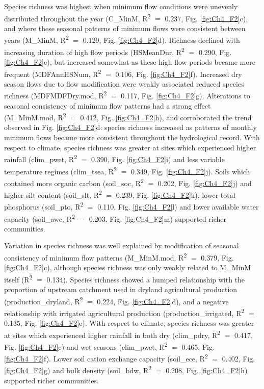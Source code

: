 Species richness was highest when minimum flow conditions were unevenly distributed throughout the year (C\_MinM, R\textsuperscript{2}  $=$ 0.237, Fig. \ref{fig:Ch4_F2}c), and where these seasonal patterns of minimum flows were consistent between years (M\_MinM, R\textsuperscript{2}  $=$ 0.129, Fig. \ref{fig:Ch4_F2}d). Richness declined with increasing duration of high flow periods (HSMeanDur, R\textsuperscript{2}  $=$ 0.290, Fig. \ref{fig:Ch4_F2}e), but increased somewhat as these high flow periods became more frequent (MDFAnnHSNum, R\textsuperscript{2}  $=$ 0.106, Fig. \ref{fig:Ch4_F2}f). Increased dry season flows due to flow modification were weakly associated reduced species richness (MDFMDFDry.mod, R\textsuperscript{2}  $=$ 0.117, Fig. \ref{fig:Ch4_F2}g). Alterations to seasonal consistency of minimum flow patterns had a strong effect (M\_MinM.mod, R\textsuperscript{2}  $=$ 0.412, Fig. \ref{fig:Ch4_F2}h), and corroborated the trend observed in Fig. \ref{fig:Ch4_F2}d: species richness increased as patterns of monthly minimum flows became more consistent throughout the hydrological record. With respect to climate, species richness was greater at sites which experienced higher rainfall (clim\_pwet, R\textsuperscript{2}  $=$ 0.390, Fig. \ref{fig:Ch4_F2}i) and less variable temperature regimes (clim\_tsea, R\textsuperscript{2}  $=$ 0.349, Fig. \ref{fig:Ch4_F2}j). Soils which contained more organic carbon (soil\_soc, R\textsuperscript{2}  $=$ 0.202, Fig. \ref{fig:Ch4_F2}j) and higher silt content (soil\_slt, R\textsuperscript{2}  $=$ 0.239, Fig. \ref{fig:Ch4_F2}k), lower total phosphorus (soil\_pto, R\textsuperscript{2}  $=$ 0.110, Fig. \ref{fig:Ch4_F2}l) and lower available water capacity (soil\_awc, R\textsuperscript{2}  $=$ 0.203, Fig. \ref{fig:Ch4_F2}m) supported richer communities.

 
Variation in species richness was well explained by modification of seasonal consistency of minimum flow patterns (M\_MinM.mod, R\textsuperscript{2}  $=$ 0.379, Fig. \ref{fig:Ch4_F2}c), although species richness was only weakly related to M_MinM itself (R\textsuperscript{2} $=$ 0.134). Species richness showed a humped relationship with the proportion of upstream catchment used in dryland agricultural production (production\_dryland, R\textsuperscript{2}  $=$ 0.224, Fig. \ref{fig:Ch4_F2}d), and a negative relationship with irrigated agricultural production (production\_irrigated, R\textsuperscript{2}  $=$ 0.135, Fig. \ref{fig:Ch4_F2}e). With respect to climate, species richness was greater at sites which experienced higher rainfall in both dry (clim\_pdry, R\textsuperscript{2}  $=$ 0.417, Fig. \ref{fig:Ch4_F2}e) and wet seasons (clim\_pwet, R\textsuperscript{2}  $=$ 0.465, Fig. \ref{fig:Ch4_F2}f). Lower soil cation exchange capacity (soil\_ece, R\textsuperscript{2}  $=$ 0.402, Fig. \ref{fig:Ch4_F2}g) and bulk density (soil\_bdw, R\textsuperscript{2}  $=$ 0.208, Fig. \ref{fig:Ch4_F2}h) supported richer communities.


